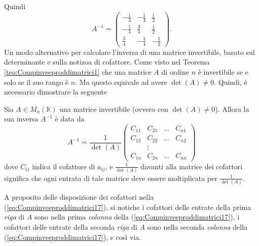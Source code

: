 Quindi
\begin{equation*}
  A^{-1}=
  \begin{pmatrix}
    -\frac{1}{4} & -\frac{1}{4} & \frac{1}{2}\\
    -\frac{1}{4} & \frac{3}{4} & \frac{1}{2}\\
    \frac{3}{4} & -\frac{1}{4} & -\frac{1}{2}
  \end{pmatrix}.
\end{equation*}
Un modo alternativo per calcolare l'inversa di una matrice invertibile, basato sul determinante e sulla
notizoa di cofattore. Come visto nel Teorema \ref{teo:Compinveeproddimatrici1} che una matrice $A$ di
ordine $n$ è invertibile se e solo se il suo rango è $n$. Ma questo equivale ad avere $\det (A)\neq 0$.
Quindi, è necessario dimostrare la seguente
\begin{prop}
  \label{prop:Compinveeproddimatrici3}
  Sia $A\in M_n(\mathds{K})$ una matrice invertibile (ovvero con $\det(A)\neq 0$). Allora la sua
  inversa $A^{-1}$ è data da
  \begin{equation}
    \label{eq:Compinveeproddimatrici17}
    A^{-1}=\frac{1}{\det(A)}
    \begin{pmatrix}
      C_{11} & C_{21} & \dots & C_{n1}\\
      C_{12} & C_{22} & \dots & C_{n2}\\
             & \vdots\\
      C_{1n} & C_{2n} &\dots & C_{nn}
    \end{pmatrix}
  \end{equation}
  dove $C_{ij}$ indica il cofattore di $a_{ij}$, e $\frac{1}{\det(A)}$ davanti alla matrice dei cofattori
  significa che ogni entrata di tale matrice deve essere moltiplicata per $\frac{1}{\det(A)}$.
\end{prop}
\begin{oss}
  \label{oss:Compinveeproddimatrici4}
  A proposito delle disposizione dei cofattori nella (\ref{eq:Compinveeproddimatrici17}), si notiche i
  cofattori delle entrate della prima \textit{riga} di $A$ sono nella prima \textit{colonna} della
  (\ref{eq:Compinveeproddimatrici17}), i cofattori delle entrate della seconda \textit{riga} di $A$
  sono nella seconda \textit{colonna} della (\ref{eq:Compinveeproddimatrici17}), e così via.
\end{oss}
